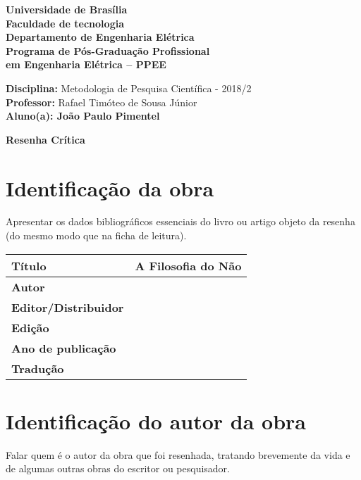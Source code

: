 \documentclass[11pt]{article}
\begin{document}
\noindent
\begin{center}
	\Large\textbf{Universidade de Brasília}\\
	\Large\textbf{Faculdade de tecnologia}\\
	\Large\textbf{Departamento de Engenharia Elétrica}\\
	\Large\textbf{Programa de Pós-Graduação Profissional \\
		em Engenharia Elétrica -- PPEE}\\
\end{center}

\large{
	\noindent
	\textbf{Disciplina:} Metodologia de Pesquisa Científica - 2018/2\\
	\textbf{Professor:} Rafael Timóteo de Sousa Júnior \\
	\textbf{Aluno(a): João Paulo Pimentel}}\\

\begin{center}
\Large\textbf{Resenha Crítica}
\end{center}
\normalsize

\section{Identificação da obra}
Apresentar os dados bibliográficos essenciais do livro ou artigo objeto da resenha (do mesmo modo que na ficha de leitura).

\begin{center}
	\begin{tabular}{|l|l|} \hline
		\textbf{Título} & A Filosofia do Não\cite{Bachelard1979} \\ \hline
		\textbf{Autor} &  \\ \hline
		\textbf{Editor/Distribuidor} & \\ \hline
		\textbf{Edição} &  \\ \hline
		\textbf{Ano de publicação} & \\ \hline
		\textbf{Tradução} &  \\ \hline
	\end{tabular}
\end{center}

\section{Identificação do autor da obra}
Falar quem é o autor da obra que foi resenhada, tratando brevemente da vida e de algumas outras obras do escritor ou pesquisador.
\end{document}
